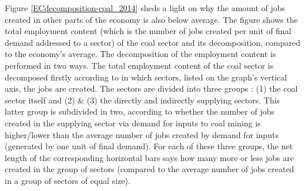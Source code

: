 \documentclass[12pt,english]{article}
\begin{document}
Figure \ref{ECdecomposition-coal_2014} sheds a light on why the amount of jobs created in other parts of the economy is also below average. %
The figure shows the total employment content (which is the number of jobs created per unit of final demand addressed to a sector) of the coal sector and its decomposition, compared to the economy's average. %
The decomposition of the employment content is performed in two ways. The total employment content of the coal sector is decomposed firstly according to in which sectors, listed on the graph's vertical axis, the jobs are created. The sectors are divided into three groups : (1) the coal sector itself and (2) \& (3) the directly and indirectly supplying sectors. This latter group is subdivided in two, according to whether the number of jobs created in the supplying sector via demand for inputs to coal mining is higher/lower than the average number of jobs created by demand for inputs (generated by one unit of final demand). For each of these three groups, the net length of the corresponding horizontal bars says how many more or less jobs are created in the group of sectors (compared to the average number of jobs created in a group of sectors of equal size). 
\end{document}
